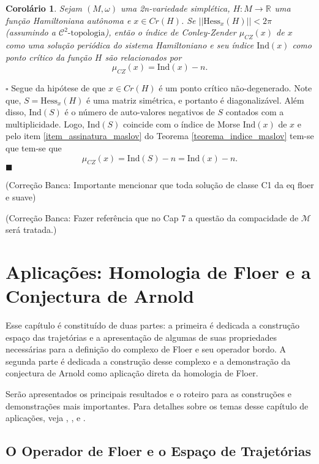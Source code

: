 \documentclass[12pt]{book}
\newtheorem{corolario}[teorema]{Corolário}
\newenvironment{prova}[1]{$\square$ #1}{\hfill$\blacksquare$}
\newcommand{\cktopologia}[1]{\mathcal{C}^{#1}\text{-topologia}}
\newcommand{\energiafinitaM}{\mathcal{M}}
\newcommand{\hessianaponto}[2]{\text{Hess}_{#1}(#2)}
\newcommand{\iconley}[1]{\iconleyabrev(#1)}
\newcommand{\iconleyabrev}{\mu_{CZ}}
\newcommand{\ind}{\text{Ind}}
\newcommand{\norma}[1]{||#1||}
\newcommand{\pontoscriticos}[1]{\textit{Cr}(#1)}
\newcommand{\real}[1]{\mathbb{R}^{#1}}
\newcommand{\reta}{\real{}}
\newcommand{\alerta}[1]{{\color{red}#1}}
\newcommand{\correcaobanca}[1]{\alerta{(Correção Banca: #1)}}
\begin{document}
	
	\begin{corolario}
		Sejam $(M,\omega)$ uma 2n-variedade simplética, $H:M\to \reta$ uma função Hamiltoniana autônoma e $x \in \pontoscriticos{H}$. Se $\norma{\hessianaponto{x}{H}}<2\pi$ (assumindo a $\cktopologia{2}$), então o índice de Conley-Zender $\iconley{x}$ de $x$ como uma solução periódica do sistema Hamiltoniano e seu índice $\ind(x)$ como ponto crítico da função $H$ são relacionados por
		$$
		\iconley{x} = \ind(x)-n.
		$$
	\end{corolario}
	\begin{prova}
		Segue da hipótese de que $x\in \pontoscriticos{H}$ é um ponto crítico não-degenerado. Note que, $S=\hessianaponto{x}{H}$ é uma matriz simétrica, e portanto é diagonalizável. Além disso, $\ind(S)$ é o número de auto-valores negativos de $S$ contados com a multiplicidade. Logo, $\ind(S)$ coincide com o índice de Morse $\ind(x)$ de $x$ e pelo item \ref{item_assinatura_maslov} do Teorema \ref{teorema_indice_maslov} tem-se que tem-se que
		$$
		\iconley{x} = \ind(S)-n = \ind(x)-n.
		$$
	\end{prova}
	

	\correcaobanca{Importante mencionar que toda solução de classe C1 da eq floer e suave}
	
	\correcaobanca{Fazer referência que no Cap 7 a questão da compacidade de $\energiafinitaM$ será tratada.}
	
	\chapter{Aplicações: Homologia de Floer e a Conjectura de Arnold}\label{capitulo_aplicacoes}
	
	Esse capítulo é constituído de duas partes: a primeira é dedicada a construção espaço das trajetórias e a apresentação de algumas de suas propriedades necessárias para a definição do complexo de Floer e seu operador bordo. A segunda parte é dedicada a construção desse complexo e a demonstração da conjectura de Arnold como aplicação direta da homologia de Floer. 
	
	Serão apresentados os principais resultados e o roteiro para as construções e demonstrações mais importantes. Para detalhes sobre os temas desse capítulo de aplicações, veja \cite{audi_floer_homology}, \cite{salamon_lecture},  \cite{salamon_conley_index} e \cite{salamon_zehnder}.
	
	
	\section{O Operador de Floer e o Espaço de Trajetórias}\label{apendice_variedades_banach}
	
\end{document}

